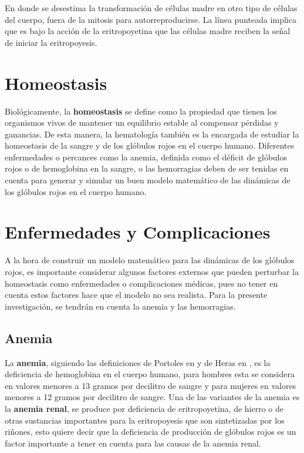 En donde se desestima la transformación de células madre en otro tipo de células del cuerpo, fuera de la mitosis para autorreproducirse. La línea punteada implica que es bajo la acción de la eritropoyetina que las células madre reciben la señal de iniciar la eritropoyesis.

\section{Homeostasis}\label{sec:RBC:homeostasis}

Biológicamente, la \textbf{homeostasis} se define como la propiedad que tienen los organismos vivos de mantener un equilibrio estable al compensar pérdidas y ganancias. De esta manera, la hematología también es la encargada de estudiar la homeostasis de la sangre y de los glóbulos rojos en el cuerpo humano. Diferentes enfermedades o percances como la anemia, definida como el déficit de glóbulos rojos o de hemoglobina en la sangre, o las hemorragias deben de ser tenidas en cuenta para generar y simular un buen modelo matemático de las dinámicas de los glóbulos rojos en el cuerpo humano.

\section{Enfermedades y Complicaciones}\label{sec:RBC:enfermedades}

A la hora de construir un modelo matemático para las dinámicas de los glóbulos rojos, es importante considerar algunos factores externos que pueden perturbar la homeostasis como enfermedades o complicaciones médicas, pues no tener en cuenta estos factores hace que el modelo no sea realista. Para la presente investigación, se tendrán en cuenta la anemia y las hemorragias.

\subsection{Anemia}\label{subsec:RBC:enfermedades:anemia}
La \textbf{anemia}, siguiendo las definiciones de Portoles en \cite{portoles2021anemia} y de Heras en \cite{heras2023anemia}, es la deficiencia de hemoglobina en el cuerpo humano, para hombres esta se considera en valores menores a 13 gramos por decilitro de sangre y para mujeres en valores menores a 12 gramos por decilitro de sangre. Una de las variantes de la anemia es la \textbf{anemia renal}, se produce por deficiencia de eritropoyetina, de hierro o de otras sustancias importantes para la eritropoyesis que son sintetizadas por los riñones, esto quiere decir que la deficiencia de producción de glóbulos rojos es un factor importante a tener en cuenta para las causas de la anemia renal.

